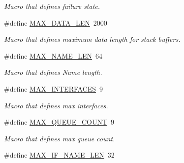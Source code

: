 \begin{DoxyCompactItemize}
\begin{DoxyCompactList}\small\item\em Macro that defines failure state. \end{DoxyCompactList}\item 
\hypertarget{group__FAPI__QOS__GENERAL_ga0c00a96baa89438d6b732b92a1ba11b9}{\#define \hyperlink{group__FAPI__QOS__GENERAL_ga0c00a96baa89438d6b732b92a1ba11b9}{M\-A\-X\-\_\-\-D\-A\-T\-A\-\_\-\-L\-E\-N}~2000}\label{group__FAPI__QOS__GENERAL_ga0c00a96baa89438d6b732b92a1ba11b9}

\begin{DoxyCompactList}\small\item\em Macro that defines maximum data length for stack buffers. \end{DoxyCompactList}\item 
\hypertarget{group__FAPI__QOS__GENERAL_gafd709f201d7643c3909621f620ea648a}{\#define \hyperlink{group__FAPI__QOS__GENERAL_gafd709f201d7643c3909621f620ea648a}{M\-A\-X\-\_\-\-N\-A\-M\-E\-\_\-\-L\-E\-N}~64}\label{group__FAPI__QOS__GENERAL_gafd709f201d7643c3909621f620ea648a}

\begin{DoxyCompactList}\small\item\em Macro that defines Name length. \end{DoxyCompactList}\item 
\hypertarget{group__FAPI__QOS__GENERAL_ga10bf2917a6a4297e21e03f60c487f591}{\#define \hyperlink{group__FAPI__QOS__GENERAL_ga10bf2917a6a4297e21e03f60c487f591}{M\-A\-X\-\_\-\-I\-N\-T\-E\-R\-F\-A\-C\-E\-S}~9}\label{group__FAPI__QOS__GENERAL_ga10bf2917a6a4297e21e03f60c487f591}

\begin{DoxyCompactList}\small\item\em Macro that defines max interfaces. \end{DoxyCompactList}\item 
\hypertarget{group__FAPI__QOS__GENERAL_ga0ec173d8fafd88fb863c4da3e11a9536}{\#define \hyperlink{group__FAPI__QOS__GENERAL_ga0ec173d8fafd88fb863c4da3e11a9536}{M\-A\-X\-\_\-\-Q\-U\-E\-U\-E\-\_\-\-C\-O\-U\-N\-T}~9}\label{group__FAPI__QOS__GENERAL_ga0ec173d8fafd88fb863c4da3e11a9536}

\begin{DoxyCompactList}\small\item\em Macro that defines max queue count. \end{DoxyCompactList}\item 
\hypertarget{group__FAPI__QOS__GENERAL_ga53a5c7c867e818bc8b6dea3105a90f62}{\#define \hyperlink{group__FAPI__QOS__GENERAL_ga53a5c7c867e818bc8b6dea3105a90f62}{M\-A\-X\-\_\-\-I\-F\-\_\-\-N\-A\-M\-E\-\_\-\-L\-E\-N}~32}\label{group__FAPI__QOS__GENERAL_ga53a5c7c867e818bc8b6dea3105a90f62}


\end{DoxyCompactItemize}
